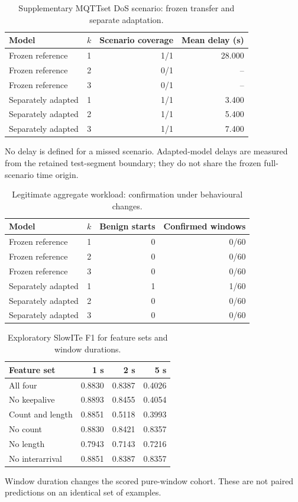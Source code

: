 \begin{table}[t]
\centering
\caption{Supplementary MQTTset DoS scenario: frozen transfer and separate adaptation.}
\label{tab:external}
\begin{tabularx}{\textwidth}{>{\raggedright\arraybackslash}Xrrr}
\toprule
Model & $k$ & Scenario coverage & Mean delay (s) \\
\midrule
Frozen reference & 1 & 1/1 & 28.000 \\
Frozen reference & 2 & 0/1 & -- \\
Frozen reference & 3 & 0/1 & -- \\
Separately adapted & 1 & 1/1 & 3.400 \\
Separately adapted & 2 & 1/1 & 5.400 \\
Separately adapted & 3 & 1/1 & 7.400 \\
\bottomrule
\end{tabularx}
\smallskip
\parbox{\textwidth}{\footnotesize No delay is defined for a missed scenario. Adapted-model delays are measured from the retained test-segment boundary; they do not share the frozen full-scenario time origin.}
\end{table}

\begin{table}[t]
\centering
\caption{Legitimate aggregate workload: confirmation under behavioural changes.}
\label{tab:benign_stress}
\begin{tabularx}{\textwidth}{>{\raggedright\arraybackslash}Xrrr}
\toprule
Model & $k$ & Benign starts & Confirmed windows \\
\midrule
Frozen reference & 1 & 0 & 0/60 \\
Frozen reference & 2 & 0 & 0/60 \\
Frozen reference & 3 & 0 & 0/60 \\
Separately adapted & 1 & 1 & 1/60 \\
Separately adapted & 2 & 0 & 0/60 \\
Separately adapted & 3 & 0 & 0/60 \\
\bottomrule
\end{tabularx}
\end{table}

\begin{table}[t]
\centering
\caption{Exploratory SlowITe F1 for feature sets and window durations.}
\label{tab:sensitivity}
\begin{tabular}{lrrr}
\toprule
Feature set & 1 s & 2 s & 5 s \\
\midrule
All four & 0.8830 & 0.8387 & 0.4026 \\
No keepalive & 0.8893 & 0.8455 & 0.4054 \\
Count and length & 0.8851 & 0.5118 & 0.3993 \\
No count & 0.8830 & 0.8421 & 0.8357 \\
No length & 0.7943 & 0.7143 & 0.7216 \\
No interarrival & 0.8851 & 0.8387 & 0.8357 \\
\bottomrule
\end{tabular}
\smallskip
\parbox{\columnwidth}{\footnotesize Window duration changes the scored pure-window cohort. These are not paired predictions on an identical set of examples.}
\end{table}

